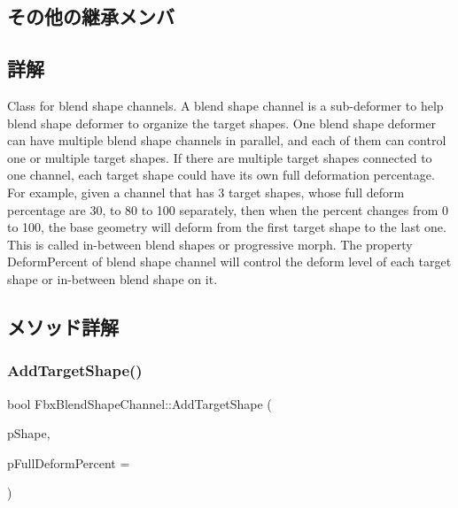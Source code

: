\subsection*{その他の継承メンバ}


\subsection{詳解}
Class for blend shape channels. A blend shape channel is a sub-\/deformer to help blend shape deformer to organize the target shapes. One blend shape deformer can have multiple blend shape channels in parallel, and each of them can control one or multiple target shapes. If there are multiple target shapes connected to one channel, each target shape could have its own full deformation percentage. For example, given a channel that has 3 target shapes, whose full deform percentage are 30, to 80 to 100 separately, then when the percent changes from 0 to 100, the base geometry will deform from the first target shape to the last one. This is called in-\/between blend shapes or progressive morph. The property Deform\+Percent of blend shape channel will control the deform level of each target shape or in-\/between blend shape on it. 

\subsection{メソッド詳解}
\mbox{\label{class_fbx_blend_shape_channel_aa09d012a7304dd2098ebd2a066d53dde}} 
\subsubsection{\texorpdfstring{Add\+Target\+Shape()}{AddTargetShape()}}
{\footnotesize\ttfamily bool Fbx\+Blend\+Shape\+Channel\+::\+Add\+Target\+Shape (\begin{DoxyParamCaption}\item[{\hyperlink{class_fbx_shape}{Fbx\+Shape} $\ast$}]{p\+Shape,  }\item[{double}]{p\+Full\+Deform\+Percent = {} }\end{DoxyParamCaption})}

